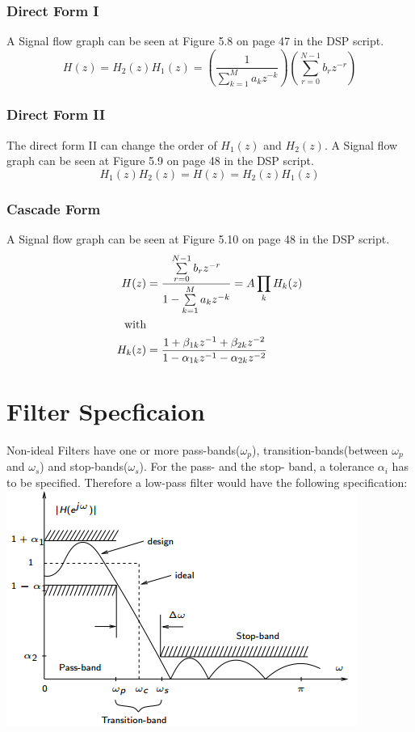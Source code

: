 \documentclass[accentcolor=tud4c,9.5pt,nochapname,bigchapter,paper=a5report]{tudreport}
\begin{document}
\subsubsection{Direct Form I}
A Signal flow graph can be seen at Figure 5.8 on page 47 in the DSP script.
\begin{equation}
H(z)=H_2(z)H_1(z)=\left(\frac{1}{\sum\limits_{k=1}^{M}a_k z^{-k}}\right)\left(\sum\limits_{r=0}^{N-1}b_rz^{-r}\right)
\end{equation}
\subsubsection{Direct Form II}
The direct form II can change the order of $H_1(z)$ and $H_2(z)$. A Signal flow graph can be seen at Figure 5.9 on page 48 in the DSP script.
\begin{equation}
H_1(z)H_2(z)=H(z)=H_2(z)H_1(z)
\end{equation}
\subsubsection{Cascade Form}
A Signal flow graph can be seen at Figure 5.10 on page 48 in the DSP script.
\begin{subequations}
\begin{align}
H(z)&=\frac{\sum\limits_{r=0}^{N-1}b_rz^{-r}}{1-\sum\limits_{k=1}^{M}a_k z^{-k}}=A\prod\limits_k H_k(z)\\
\text{with} \notag\\
H_k(z)&=\frac{1+\beta_{1k}z^{-1}+\beta_{2k}z^{-2}}{1-\alpha_{1k}z^{-1}-\alpha_{2k}z^{-2}}
\end{align}
\end{subequations}

\section {Filter Specficaion}
Non-ideal Filters have one or more pass-bands($\omega_p$), 
transition-bands(between $\omega_p$ and $\omega_s$) and stop-bands($\omega_s$). 
For the pass- and the stop- band, a tolerance
$\alpha_i$ has to be specified. Therefore a low-pass filter would have the following specification:
\includegraphics[width=\textwidth]{images/filter_spec.png}
\end{document}
